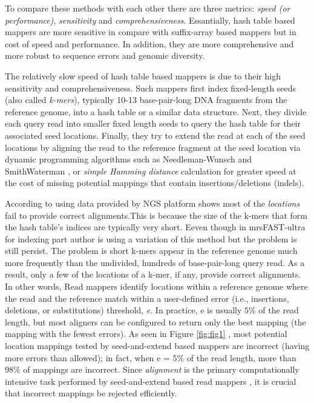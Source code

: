 To compare these  methods with each other there are three metrics: \emph{speed (or performance)}, \emph{sensitivity} and \emph{comprehensiveness}. Essantially, hash table based mappers are more sensitive in compare with suffix-array based mappers but in cost of speed and performance. In addition, they are more comprehensive and more robust to sequence errors and genomic diversity.

The relatively slow speed of hash table based mappers is due to their high sensitivity and comprehensiveness. Such mappers first index fixed-length seeds (also called \emph{k-mers}), typically 10-13 base-pair-long DNA fragments from the reference genome, into a hash table or a similar data structure. Next, they divide each query read into smaller fixed length seeds to query the hash table for their associated seed locations. Finally, they try to extend the read at each of the seed locations by aligning the read to the reference fragment at the seed location via dynamic programming algorithms such as Needleman-Wunsch \cite{needleman} and SmithWaterman \cite{smith1981identification}, or \emph{simple Hamming distance} calculation for greater speed at the cost of missing potential mappings that contain insertions/deletions (indels).

According to \cite{fasthash} using data provided by NGS platform shows most of the \textit{locations} fail to provide correct alignments.This is because the size of the k-mers that form the hash table’s indices are typically very short. Eeven though in mrsFAST-ultra\cite{mrsfastultra} for indexing part author is using a variation of this method but the problem is still persist. The problem is short k-mers appear in the reference genome much more frequently than the undivided, hundreds of base-pair-long query read. As a result, only a few of the locations of a k-mer, if any, provide correct alignments. In other words, Read mappers identify locations within a reference genome where the read and the reference match within a user-defined error (i.e., insertions, deletions, or substitutions) threshold, \emph{e}. In practice, e is usually $5\%$ of the read length, but most aligners can be configured to return only the best mapping (the mapping with the fewest errors). As seen in Figure \ref{fig:fig1} \cite{shd}, most potential location mappings tested by seed-and-extend based mappers are incorrect (having more errors than allowed); in fact, when e = $5\%$ of the read length, more than $98\%$ of mappings are incorrect. Since \emph{alignment} is the primary computationally intensive task performed by seed-and-extend based read mappers \cite{fasthash}, it is crucial that incorrect mappings be rejected efficiently. 

  
  
  